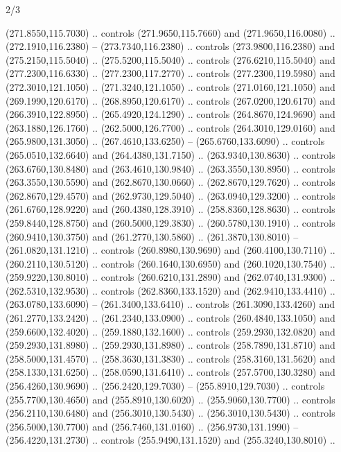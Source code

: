 \begin{flagdescription}{2/3}
\begin{scope}[xshift=0.5\flaglength,yshift=0.5\flagwidth,scale=\flagwidth/259.2]
\begin{scope}[y=0.8pt, x=0.8pt, yscale=-1,shift={(-243,-162)}]
      (271.8550,115.7030) .. controls (271.9650,115.7660) and (271.9650,116.0080) ..
      (272.1910,116.2380) -- (273.7340,116.2380) .. controls (273.9800,116.2380) and
      (275.2150,115.5040) .. (275.5200,115.5040) .. controls (276.6210,115.5040) and
      (277.2300,116.6330) .. (277.2300,117.2770) .. controls (277.2300,119.5980) and
      (272.3010,121.1050) .. (271.3240,121.1050) .. controls (271.0160,121.1050) and
      (269.1990,120.6170) .. (268.8950,120.6170) .. controls (267.0200,120.6170) and
      (266.3910,122.8950) .. (265.4920,124.1290) .. controls (264.8670,124.9690) and
      (263.1880,126.1760) .. (262.5000,126.7700) .. controls (264.3010,129.0160) and
      (265.9800,131.3050) .. (267.4610,133.6250) -- (265.6760,133.6090) .. controls
      (265.0510,132.6640) and (264.4380,131.7150) .. (263.9340,130.8630) .. controls
      (263.6760,130.8480) and (263.4610,130.9840) .. (263.3550,130.8950) .. controls
      (263.3550,130.5590) and (262.8670,130.0660) .. (262.8670,129.7620) .. controls
      (262.8670,129.4570) and (262.9730,129.5040) .. (263.0940,129.3200) .. controls
      (261.6760,128.9220) and (260.4380,128.3910) .. (258.8360,128.8630) .. controls
      (259.8440,128.8750) and (260.5000,129.3830) .. (260.5780,130.1910) .. controls
      (260.9410,130.3750) and (261.2770,130.5860) .. (261.3870,130.8010) --
      (261.0820,131.1210) .. controls (260.8980,130.9690) and (260.4100,130.7110) ..
      (260.2110,130.5120) .. controls (260.1640,130.6950) and (260.1020,130.7540) ..
      (259.9220,130.8010) .. controls (260.6210,131.2890) and (262.0740,131.9300) ..
      (262.5310,132.9530) .. controls (262.8360,133.1520) and (262.9410,133.4410) ..
      (263.0780,133.6090) -- (261.3400,133.6410) .. controls (261.3090,133.4260) and
      (261.2770,133.2420) .. (261.2340,133.0900) .. controls (260.4840,133.1050) and
      (259.6600,132.4020) .. (259.1880,132.1600) .. controls (259.2930,132.0820) and
      (259.2930,131.8980) .. (259.2930,131.8980) .. controls (258.7890,131.8710) and
      (258.5000,131.4570) .. (258.3630,131.3830) .. controls (258.3160,131.5620) and
      (258.1330,131.6250) .. (258.0590,131.6410) .. controls (257.5700,130.3280) and
      (256.4260,130.9690) .. (256.2420,129.7030) -- (255.8910,129.7030) .. controls
      (255.7700,130.4650) and (255.8910,130.6020) .. (255.9060,130.7700) .. controls
      (256.2110,130.6480) and (256.3010,130.5430) .. (256.3010,130.5430) .. controls
      (256.5000,130.7700) and (256.7460,131.0160) .. (256.9730,131.1990) --
      (256.4220,131.2730) .. controls (255.9490,131.1520) and (255.3240,130.8010) ..

\end{scope}
\end{scope}
\end{flagdescription}
